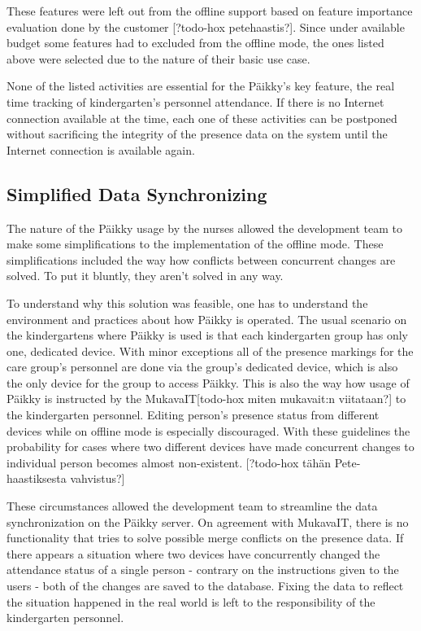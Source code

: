 These features were left out from the offline support based on feature importance evaluation done by the customer [?todo-hox petehaastis?]. Since under available budget some features had to excluded from the offline mode, the ones listed above were selected due to the nature of their basic use case.

None of the listed activities are essential for the Päikky's key feature, the real time tracking of kindergarten's personnel attendance. If there is no Internet connection available at the time, each one of these activities can be postponed without sacrificing the integrity of the presence data on the system until the Internet connection is available again.




\subsection{Simplified Data Synchronizing}
The nature of the Päikky usage by the nurses allowed the development team to make some simplifications to the implementation of the offline mode. These simplifications included the way how conflicts between concurrent changes are solved. To put it bluntly, they aren't solved in any way.

To understand why this solution was feasible, one has to understand the environment and practices about how Päikky is operated. The usual scenario on the kindergartens where Päikky is used is that each kindergarten group has only one, dedicated device. With minor exceptions all of the presence markings for the care group's personnel are done via the group's dedicated device, which is also the only device for the group to access Päikky. This is also the way how usage of Päikky is instructed by the MukavaIT[todo-hox miten mukavait:n viitataan?] to the kindergarten personnel. Editing person's presence status from different devices while on offline mode is especially discouraged. With these guidelines the probability for cases where two different devices have made concurrent changes to individual person becomes almost non-existent. [?todo-hox tähän Pete-haastiksesta vahvistus?]

These circumstances allowed the development team to streamline the data synchronization on the Päikky server. On agreement with MukavaIT, there is no functionality that tries to solve possible merge conflicts on the presence data. If there appears a situation where two devices have concurrently changed the attendance status of a single person - contrary on the instructions given to the users - both of the changes are saved to the database. Fixing the data to reflect the situation happened in the real world is left to the responsibility of the kindergarten personnel. 

